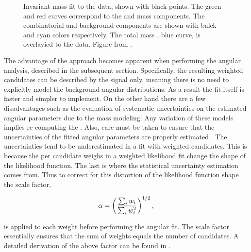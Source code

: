 \begin{figure}[t]
  \centering
  \scalebox{0.5}{}
  \caption{Invariant mass fit to the data, shown with black points. The green and red curves correspond to the \BdJpsiKst and
           \BsJpsiKst mass \pdf components. The combinatorial and \LbJpsipK background components are shown with balck and cyan
           colors respectively. The total mass \pdf, blue curve, is overlayied to the data. Figure from \cite{bsjpsikst-paper}. }
  \label{mass_plot}
\end{figure}

The advantage of the \sWeights approach becomes apparent when performing the angular analysis, described in the subsequent section.
Specifically, the resulting weighted candidates can be described by the signal \pdf only, meaning there is no need to explicitly model
the background angular distributions. As a result the fit itself is faster and simpler to implement. On the other hand there are a few
disadvantages such as the evaluation of systematic uncertainties on the estimated angular parameters due to the mass \pdf modeling:
Any variation of these models implies re-computing the \sWeights. Also, care must be taken to ensure that the uncertainties
of the fitted angular parameters are properly estimated \cite{splot}. The uncertainties tend to be underestimated in a fit
with weighted candidates. This is because the per candidate weighs in a weighted likelihood fit change the shape of the likelihood function.
The last is where the statistical uncertainty estimation comes from. Thus to correct for this distortion of the likelihood
function shape the scale factor,

\begin{equation}
  \centering
  \alpha = \left(\frac{\sum_{i} w_i}{\sum_{i} w_i^2}\right)^{1/2},
  \label{sWeights_scale_factor}
\end{equation}

\noindent is applied to each weight before performing the angular fit. The scale factor essentially ensures that the sum of weights
equals the number of candidates. A detailed derivation of the above factor can be found in \cite{jeroenThesis}.
